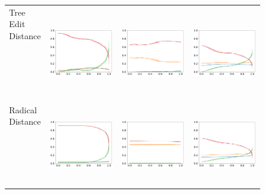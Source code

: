 \begin{figure}
{\begin{tabular}{lccc}
\shortstack{Tree Edit\\Distance\\\text{ }\\\text{ }\\\text{ }\\\text{ }\\\text{ }\\\text{ }}      & \includegraphics[width=.25\linewidth]{code/img/operation_count_zss_AT1.pdf} & \includegraphics[width=.25\linewidth]{code/img/operation_count_zss_AT1-2.pdf} & \includegraphics[width=.25\linewidth]{code/img/operation_count_zss_AT2.pdf} \\
\shortstack{Radical\\Distance\\\text{ }\\\text{ }\\\text{ }\\\text{ }\\\text{ }\\\text{ }}       & \includegraphics[width=.25\linewidth]{code/img/operation_count_rrd_AT1.pdf} & \includegraphics[width=.25\linewidth]{code/img/operation_count_rrd_AT1-2.pdf} & \includegraphics[width=.25\linewidth]{code/img/operation_count_rrd_AT2.pdf} \\

\end{tabular}}
\end{figure}
